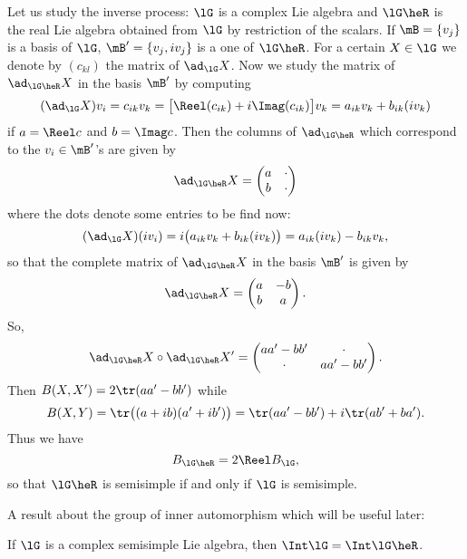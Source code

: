 Let us study the inverse process: $\lG$ is a complex Lie algebra and $\lG\heR$ is the real Lie algebra obtained from $\lG$ by restriction of the scalars. If $\mB=\{v_j\}$ is a basis of $\lG$, $\mB'=\{v_j,iv_j\}$ is a one of $\lG\heR$. For a certain $X\in\lG$ we denote by $(c_{kl})$ the matrix of $\ad_{\lG}X$. Now we study the matrix of $\ad_{\lG\heR}X$ in the basis $\mB'$ by computing
\begin{equation}
(\ad_{\lG}X)v_i=c_{ik}v_k
               =\big[ \Reel(c_{ik})+i\Imag(c_{ik}) \big]v_k
           =a_{ik}v_k+b_{ik}(iv_k)
\end{equation}
if $a=\Reel c$ and $b=\Imag c$. Then the columns of $\ad_{\lG\heR}$ which correspond to the $v_i\in\mB'$'s are given by
\[
\ad_{\lG\heR}X=\begin{pmatrix}
                 a&\cdot\\
         b&\cdot
               \end{pmatrix}
\]
where the dots denote some entries to be find now:
\begin{equation}
(\ad_{\lG}X)(iv_i)=i\big(  a_{ik}v_k+b_{ik}(iv_k)  \big)\\
                  =a_{ik}(iv_k)-b_{ik}v_k,
\end{equation}
so that the complete matrix of $\ad_{\lG\heR}X$ in the basis $\mB'$ is given by
\[
\ad_{\lG\heR}X=\begin{pmatrix}
                 a&-b\\
         b&a
               \end{pmatrix}.
\]
So,
\[
\ad_{\lG\heR}X\circ\ad_{\lG\heR}X'=\begin{pmatrix}
                 aa'-bb'&\cdot\\
         \cdot&aa'-bb'
               \end{pmatrix}.
\]
Then $B(X,X')=2\tr(aa'-bb')$ while
\begin{equation}
  B(X,Y)=\tr\big(  (a+ib)(a'+ib')  \big)\\
        =\tr(aa'-bb')+i\tr(ab'+ba').
\end{equation}
Thus we have
\begin{equation}
     B_{\lG\heR}=2\Reel B_{\lG},
\end{equation}
so that $\lG\heR$ is semisimple if and only if $\lG$ is semisimple. 

A result about the group of inner automorphism which will be useful later:

\begin{lemma}\label{lem:Int_g_gR}
If $\lG$ is a complex semisimple Lie algebra, then $\Int\lG=\Int\lG\heR$.
\end{lemma}

